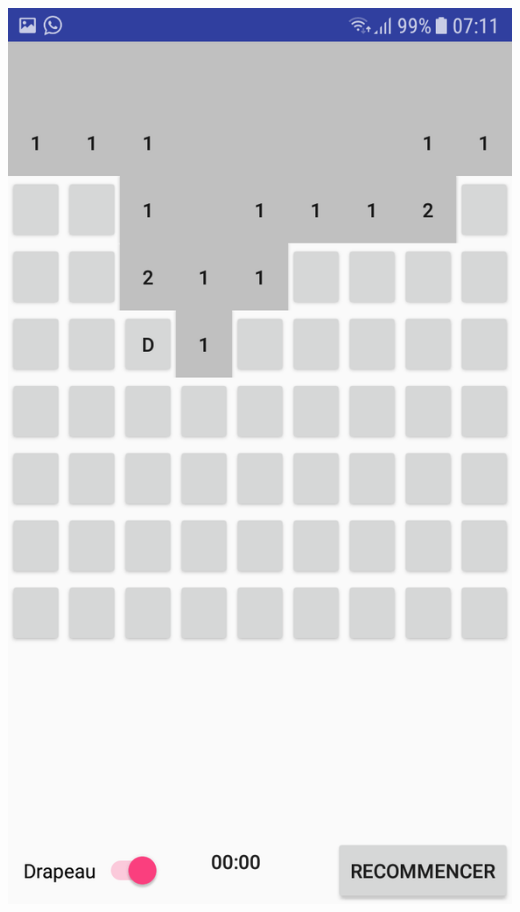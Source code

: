 \documentclass{article}
\begin{document}
\begin{center}
   \includegraphics[scale=0.12]{2.png}

\end{center}
\end{document}

